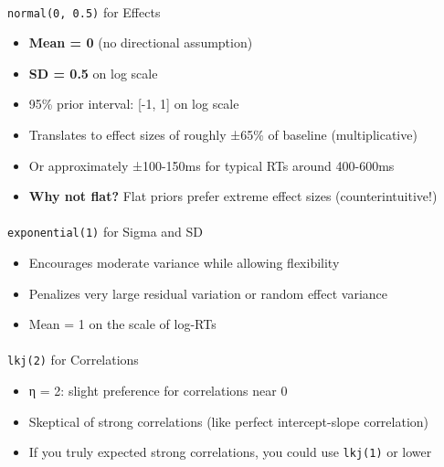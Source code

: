\documentclass[
  11pt,
]{article}
\makeatletter
\let\oldparagraph\paragraph
\renewcommand{\paragraph}{
    \@ifstar
      \xxxParagraphStar
      \xxxParagraphNoStar
  }
\newcommand{\xxxParagraphStar}[1]{\oldparagraph*{#1}\mbox{}}
\newcommand{\xxxParagraphNoStar}[1]{\oldparagraph{#1}\mbox{}}
\providecommand{\tightlist}{%
  \setlength{\itemsep}{0pt}\setlength{\parskip}{0pt}}
\makeatother
\begin{document}
\paragraph{\texorpdfstring{\texttt{normal(0,\ 0.5)} for
Effects}{normal(0, 0.5) for Effects}}\label{normal0-0.5-for-effects}

\begin{itemize}
\tightlist
\item
  \textbf{Mean = 0} (no directional assumption)
\item
  \textbf{SD = 0.5} on log scale
\item
  95\% prior interval: {[}-1, 1{]} on log scale
\item
  Translates to effect sizes of roughly ±65\% of baseline
  (multiplicative)
\item
  Or approximately ±100-150ms for typical RTs around 400-600ms
\item
  \textbf{Why not flat?} Flat priors prefer extreme effect sizes
  (counterintuitive!)
\end{itemize}

\paragraph{\texorpdfstring{\texttt{exponential(1)} for Sigma and
SD}{exponential(1) for Sigma and SD}}\label{exponential1-for-sigma-and-sd}

\begin{itemize}
\tightlist
\item
  Encourages moderate variance while allowing flexibility
\item
  Penalizes very large residual variation or random effect variance
\item
  Mean = 1 on the scale of log-RTs
\end{itemize}

\paragraph{\texorpdfstring{\texttt{lkj(2)} for
Correlations}{lkj(2) for Correlations}}\label{lkj2-for-correlations}

\begin{itemize}
\tightlist
\item
  η = 2: slight preference for correlations near 0
\item
  Skeptical of strong correlations (like perfect intercept-slope
  correlation)
\item
  If you truly expected strong correlations, you could use
  \texttt{lkj(1)} or lower
\end{itemize}
\end{document}
